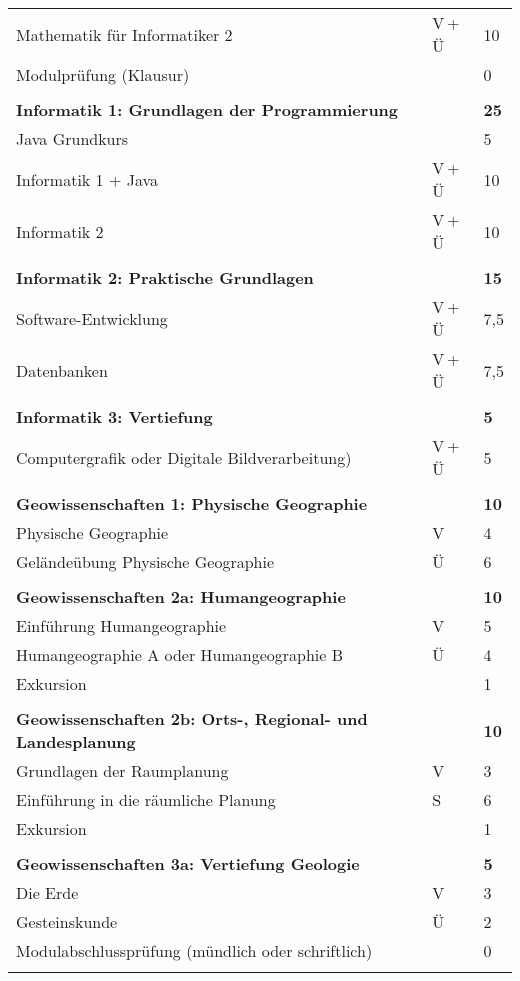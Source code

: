 \begin{longtable}{p{} p{} p{}}
Mathematik für Informatiker 2 & V\,+\,Ü & 10\\
Modulprüfung (Klausur) & & 0\\
&&\\
\textbf{Informatik 1: Grundlagen der Programmierung} & & \textbf{25}\\
Java Grundkurs &  & 5\\ 
Informatik 1 + Java & V\,+\,Ü & 10\\ 
Informatik 2 & V\,+\,Ü & 10\\
&&\\
\textbf{Informatik 2: Praktische Grundlagen}& &\textbf{15}\\
Software-Entwicklung & V\,+\,Ü & 7,5\\
Datenbanken & V\,+\,Ü & 7,5\\
&&\\
\textbf{Informatik 3: Vertiefung} & & \textbf{5}\\
Computergrafik oder Digitale Bildverarbeitung) & V\,+\,Ü & 5\\
&&\\
\textbf{Geowissenschaften 1: Physische Geographie} & & \textbf{10}\\
Physische Geographie & V & 4\\
Geländeübung Physische Geographie & Ü & 6\\
&&\\
\textbf{Geowissenschaften 2a: Humangeographie} & & \textbf{10}\\
Einführung Humangeographie & V & 5\\
Humangeographie A oder Humangeographie B & Ü & 4\\
Exkursion & & 1\\
&&\\
\textbf{Geowissenschaften 2b: Orts-, Regional- und Landesplanung} & & \textbf{10}\\
Grundlagen der Raumplanung & V & 3\\
Einführung in die räumliche Planung & S & 6\\
Exkursion & & 1\\
&&\\
\textbf{Geowissenschaften 3a: Vertiefung Geologie} & & \textbf{5}\\
Die Erde & V & 3\\
Gesteinskunde & Ü & 2\\
Modulabschlussprüfung (mündlich oder schriftlich) & & 0\\
&&\\

\end{longtable}
